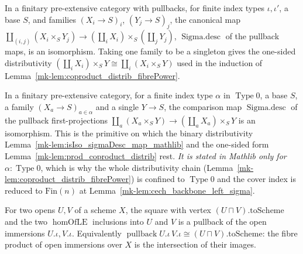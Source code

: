 \begin{lemma}
  \label{mk-lem:isIso_sigmaDesc_map_mathlib}
  \mathlibok

  In a finitary pre-extensive category with pullbacks, for finite index types \(\iota, \iota'\),
  a base \(S\), and families \((X_i \to S)_i\), \((Y_j \to S)_j\), the canonical map
  \(\coprod_{(i,j)} (X_i \times_S Y_j) \to (\coprod_i X_i) \times_S (\coprod_j Y_j)\),
  \(\operatorname{Sigma.desc}\) of the pullback maps, is an isomorphism. Taking one family to be a
  singleton gives the one-sided distributivity
  \((\coprod_i X_i) \times_S Y \cong \coprod_i (X_i \times_S Y)\) used in the induction of
  Lemma~\ref{mk-lem:coproduct_distrib_fibrePower}.
\end{lemma}

\begin{lemma}
  \label{mk-lem:isIso_sigmaDesc_fst_mathlib}
  \mathlibok

  In a finitary pre-extensive category, for a finite index type \(\alpha\) in \(\operatorname{Type}
  0\), a base \(S\), a family \((X_a \to S)_{a \in \alpha}\) and a single \(Y \to S\), the comparison
  map \(\operatorname{Sigma.desc}\) of the pullback first-projections
  \(\coprod_a (X_a \times_S Y) \to (\coprod_a X_a) \times_S Y\) is an isomorphism. This is the
  primitive on which the binary distributivity Lemma~\ref{mk-lem:isIso_sigmaDesc_map_mathlib} and the
  one-sided form Lemma~\ref{mk-lem:prod_coproduct_distrib} rest. \emph{It is stated in Mathlib only for}
  \(\alpha : \operatorname{Type} 0\), which is why the whole distributivity chain
  (Lemma~\ref{mk-lem:coproduct_distrib_fibrePower}) is confined to \(\operatorname{Type} 0\) and the
  cover index is reduced to \(\mathrm{Fin}(n)\) at Lemma~\ref{mk-lem:cech_backbone_left_sigma}.
\end{lemma}

\begin{lemma}
  \label{mk-lem:isPullback_opens_inf_mathlib}
  \mathlibok

  For two opens \(U, V\) of a scheme \(X\), the square with vertex \((U \sqcap V).\mathrm{toScheme}\)
  and the two \(\operatorname{homOfLE}\) inclusions into \(U\) and \(V\) is a pullback of the open
  immersions \(U.\iota, V.\iota\). Equivalently \(\operatorname{pullback} U.\iota\,V.\iota \cong
  (U \sqcap V).\mathrm{toScheme}\): the fibre product of open immersions over \(X\) is the
  intersection of their images.
\end{lemma}


